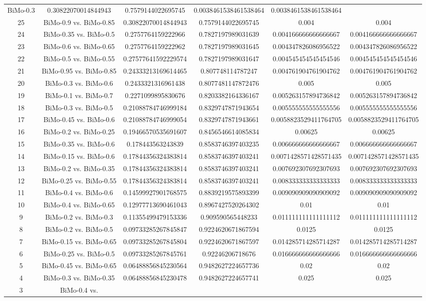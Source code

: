 \documentclass[a4paper,10pt]{article}
\begin{document}
\begin{landscape}
\begin{table}[!htp]
\begin{tabular}{cccccc}
BiMo-0.3&0.30822070014844943&0.7579144022695745&0.0038461538461538464&0.0038461538461538464\\25&BiMo-0.9 vs. BiMo-0.85&0.30822070014844943&0.7579144022695745&0.004&0.004\\24&BiMo-0.35 vs. BiMo-0.5&0.2757764159222966&0.7827197989031639&0.004166666666666667&0.004166666666666667\\23&BiMo-0.6 vs. BiMo-0.65&0.2757764159222962&0.7827197989031645&0.004347826086956522&0.004347826086956522\\22&BiMo-0.5 vs. BiMo-0.55&0.27577641592229574&0.7827197989031647&0.004545454545454546&0.004545454545454546\\21&BiMo-0.95 vs. BiMo-0.85&0.24333213169614465&0.807748114787247&0.004761904761904762&0.004761904761904762\\20&BiMo-0.3 vs. BiMo-0.6&0.2433321316961438&0.8077481147872476&0.005&0.005\\19&BiMo-0.1 vs. BiMo-0.7&0.2271099895830676&0.8203382164336167&0.005263157894736842&0.005263157894736842\\18&BiMo-0.3 vs. BiMo-0.5&0.21088784746999184&0.8329747871943654&0.005555555555555556&0.005555555555555556\\17&BiMo-0.45 vs. BiMo-0.6&0.21088784746999054&0.8329747871943661&0.0058823529411764705&0.0058823529411764705\\16&BiMo-0.2 vs. BiMo-0.25&0.19466570535691607&0.8456546614085834&0.00625&0.00625\\15&BiMo-0.35 vs. BiMo-0.6&0.178443563243839&0.8583746397403235&0.006666666666666667&0.006666666666666667\\14&BiMo-0.15 vs. BiMo-0.6&0.17844356324383814&0.8583746397403241&0.0071428571428571435&0.0071428571428571435\\13&BiMo-0.2 vs. BiMo-0.35&0.17844356324383814&0.8583746397403241&0.007692307692307693&0.007692307692307693\\12&BiMo-0.25 vs. BiMo-0.55&0.17844356324383814&0.8583746397403241&0.008333333333333333&0.008333333333333333\\11&BiMo-0.4 vs. BiMo-0.6&0.14599927901768575&0.8839219575893399&0.009090909090909092&0.009090909090909092\\10&BiMo-0.4 vs. BiMo-0.65&0.12977713690461043&0.8967427520264302&0.01&0.01\\9&BiMo-0.2 vs. BiMo-0.3&0.11355499479153336&0.909590565448233&0.011111111111111112&0.011111111111111112\\8&BiMo-0.2 vs. BiMo-0.5&0.09733285267845847&0.9224620671867594&0.0125&0.0125\\7&BiMo-0.15 vs. BiMo-0.65&0.09733285267845804&0.9224620671867597&0.014285714285714287&0.014285714285714287\\6&BiMo-0.25 vs. BiMo-0.5&0.09733285267845761&0.92246206718676&0.016666666666666666&0.016666666666666666\\5&BiMo-0.45 vs. BiMo-0.65&0.06488856845230564&0.9482627224657736&0.02&0.02\\4&BiMo-0.3 vs. BiMo-0.35&0.06488856845230478&0.9482627224657741&0.025&0.025\\3&BiMo-0.4 vs. 
\end{tabular}
\end{table}
\end{landscape}
\end{document}
